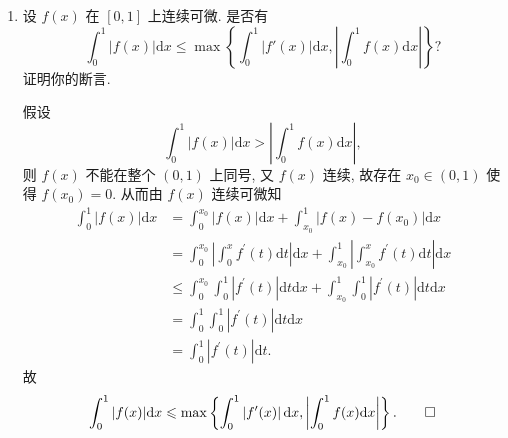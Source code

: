 \begin{enumerate}
\item[五、]
设 $f(x)$ 在 $[0,1]$ 上连续可微. 是否有
$$\int_0^1 |f(x)|\mathrm{d}x \leqslant \max \left\{ \int_0^1\left| f'(x) \right| \mathrm{d}x , \left| \int_0^1 f(x) \mathrm{d}x \right| \right\}?$$
证明你的断言. 
\begin{proofc}
    假设
    $$\int_0^1 |f(x)|\mathrm{d}x > \left| \int_0^1 f(x) \mathrm{d}x \right|,$$
    则 $f(x)$ 不能在整个 $(0,1)$ 上同号,
    又 $f(x)$ 连续,
    故存在 $x_0\in (0,1)$ 使得 $f(x_0)=0$.
    从而由 $f(x)$ 连续可微知
    \begin{align*}
        \int_0^1 |f(x)|\mathrm{d}x
        &= \int_0^{x_0} |f(x)|\mathrm{d}x + \int_{x_0}^{1} \left|f(x)-f(x_0)\right| \mathrm{d}x \\
        &= \int_0^{x_0} \left| \int_0^{x} f^\prime(t)\mathrm{d}t \right| \mathrm{d}x + \int_{x_0}^1 \left| \int_{x_0}^x f^\prime(t)\mathrm{d}t \right| \mathrm{d}x \\
        &\leqslant \int_0^{x_0} \int_0^{1} \left| f^\prime(t)\right| \mathrm{d}t \mathrm{d}x + \int_{x_0}^{1} \int_0^{1} \left| f^\prime(t) \right| \mathrm{d}t \mathrm{d}x \\
        &= \int_0^{1} \int_0^{1} \left| f^\prime(t) \right| \mathrm{d}t \mathrm{d}x \\
        &= \int_0^{1} \left| f^\prime(t) \right| \mathrm{d}t.
    \end{align*}
    故
    $$\int_0^1 |f(x)|\mathrm{d}x \leqslant \max \left\{ \int_0^1\left| f'(x) \right| \mathrm{d}x , \left| \int_0^1 f(x) \mathrm{d}x \right| \right\}.\qedhere$$
\end{proofc}

\end{enumerate}

